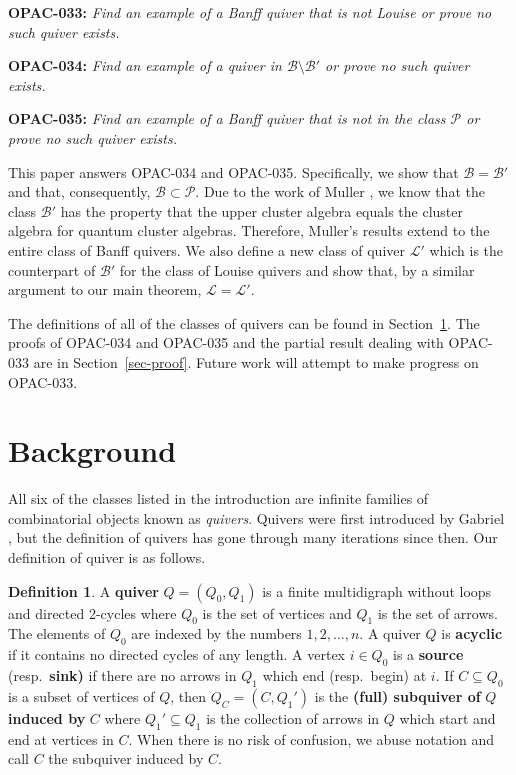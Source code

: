 \documentclass[10pt]{amsart}
\theoremstyle{definition}
\newtheorem{defi}[thm]{Definition}
\theoremstyle{remark}
\newcommand{\resp}{resp.\ }
\newcommand{\BB}{\mathcal{B}}
\newcommand{\PP}{\mathcal{P}}
\newcommand{\LL}{\mathcal{L}}
\begin{document}
\textbf{OPAC-033:} \textit{Find an example of a Banff quiver that is not Louise or prove no such quiver exists.} 

\textbf{OPAC-034:} \textit{Find an example of a quiver in $\BB \setminus \BB'$  or prove no such quiver exists.}

\textbf{OPAC-035:} \textit{Find an example of a Banff quiver that is not in the class $\PP$ or prove no such quiver exists.}

This paper answers OPAC-034 and OPAC-035.
Specifically, we show that $\BB = \BB'$ and that, consequently, $\BB \subset \PP$.
Due to the work of Muller \cite[Lemma 8.13]{MR3551171}, we know that the class $\BB'$ has the property that the upper cluster algebra equals the cluster algebra for quantum cluster algebras. 
Therefore, Muller's results extend to the entire class of Banff quivers.
We also define a new class of quiver $\LL'$ which is the counterpart of $\BB'$ for the class of Louise quivers and show that, by a similar argument to our main theorem, $\LL = \LL'$. 

The definitions of all of the classes of quivers can be found in Section~\ref{sec-background}.
The proofs of OPAC-034 and OPAC-035 and the partial result dealing with OPAC-033 are in Section~\ref{sec-proof}. 
Future work will attempt to make progress on OPAC-033.

\section{Background}\label{sec-background}

All six of the classes listed in the introduction are infinite families of combinatorial objects known as \textit{quivers}.
Quivers were first introduced by Gabriel \cite{MR0332887}, but the definition of quivers has gone through many iterations since then.
Our definition of quiver is as follows.

\begin{defi}\label{def-quiver}
    A \textbf{quiver} $Q = (Q_0, Q_1)$ is a finite multidigraph without loops and directed 2-cycles where $Q_0$ is the set of vertices and $Q_1$ is the set of arrows.
    The elements of $Q_0$ are indexed by the numbers $1, 2, \ldots, n$. 
    A quiver $Q$ is \textbf{acyclic} if it contains no directed cycles of any length.
    A vertex $i \in Q_0$ is a \textbf{source} (\resp \textbf{sink)} if there are no arrows in $Q_1$ which end (\resp begin) at $i$.
    If $C \subseteq Q_0$ is a subset of vertices of $Q$, then $Q_C = (C, Q_1')$ is the \textbf{(full) subquiver of} $Q$ \textbf{induced by} $C$ where $Q_1' \subseteq Q_1$ is the collection of arrows in $Q$ which start and end at vertices in $C$.
    When there is no risk of confusion, we abuse notation and call $C$ the subquiver induced by $C$.
\end{defi}
\end{document}
